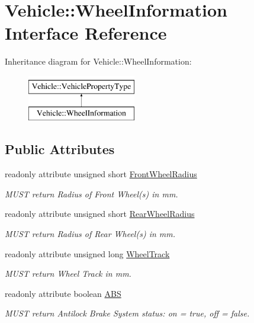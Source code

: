\hypertarget{interfaceVehicle_1_1WheelInformation}{\section{Vehicle\-:\-:Wheel\-Information Interface Reference}
\label{interfaceVehicle_1_1WheelInformation}
}
Inheritance diagram for Vehicle\-:\-:Wheel\-Information\-:\begin{figure}[H]
\begin{center}
\leavevmode
\includegraphics[height=2.000000cm]{interfaceVehicle_1_1WheelInformation}
\end{center}
\end{figure}
\subsection*{Public Attributes}
\begin{DoxyCompactItemize}
\item 
readonly attribute unsigned short \hyperlink{interfaceVehicle_1_1WheelInformation_a5589adcf5abf655ab247d50778b9e187}{Front\-Wheel\-Radius}
\begin{DoxyCompactList}\small\item\em M\-U\-S\-T return Radius of Front Wheel(s) in mm. \end{DoxyCompactList}\item 
readonly attribute unsigned short \hyperlink{interfaceVehicle_1_1WheelInformation_a3ef4e44bfe9d502d64711c9afc14f905}{Rear\-Wheel\-Radius}
\begin{DoxyCompactList}\small\item\em M\-U\-S\-T return Radius of Rear Wheel(s) in mm. \end{DoxyCompactList}\item 
readonly attribute unsigned long \hyperlink{interfaceVehicle_1_1WheelInformation_aac11e08b85cccc37f8383b9ccbd6819d}{Wheel\-Track}
\begin{DoxyCompactList}\small\item\em M\-U\-S\-T return Wheel Track in mm. \end{DoxyCompactList}\item 
readonly attribute boolean \hyperlink{interfaceVehicle_1_1WheelInformation_a0f79cf84bcfeecd2cb98f3cce0e440b4}{A\-B\-S}
\begin{DoxyCompactList}\small\item\em M\-U\-S\-T return Antilock Brake System status\-: on = true, off = false. \end{DoxyCompactList}\end{DoxyCompactItemize}
